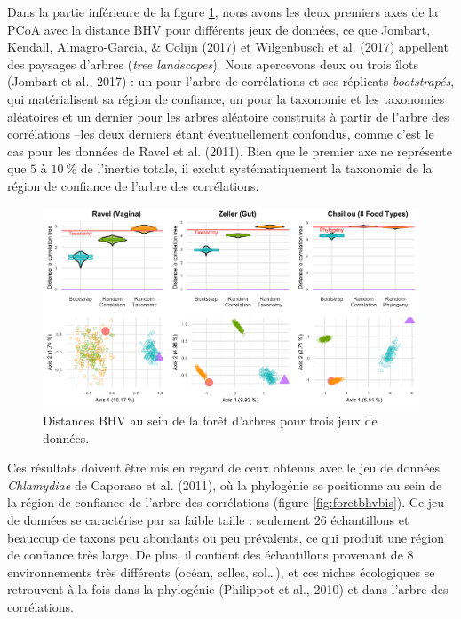 \documentclass[12pt,a4paper]{reedthesis}
\theoremstyle{definition}
\theoremstyle{definition}
\theoremstyle{definition}
\theoremstyle{remark}
\begin{document}
Dans la partie inférieure de la figure \ref{fig:foretbhv}, nous avons les deux premiers axes de la PCoA avec la distance BHV pour différents jeux de données, ce que Jombart, Kendall, Almagro-Garcia, \& Colijn (2017) et Wilgenbusch et al. (2017) appellent des paysages d'arbres (\emph{tree landscapes}). Nous apercevons deux ou trois îlots (Jombart et al., 2017) : un pour l'arbre de corrélations et ses réplicats \emph{bootstrapés}, qui matérialisent sa région de confiance, un pour la taxonomie et les taxonomies aléatoires et un dernier pour les arbres aléatoire construits à partir de l'arbre des corrélations --les deux derniers étant éventuellement confondus, comme c'est le cas pour les données de Ravel et al. (2011). Bien que le premier axe ne représente que \(5\) à \(10~\%\) de l'inertie totale, il exclut systématiquement la taxonomie de la région de confiance de l'arbre des corrélations.


\begin{figure}[t]

{\centering \includegraphics[width=0.9\linewidth]{img/foretbhv} 

}

\caption{Distances BHV au sein de la forêt d'arbres pour trois jeux de données.}\label{fig:foretbhv}
\end{figure}
Ces résultats doivent être mis en regard de ceux obtenus avec le jeu de données \emph{Chlamydiae} de Caporaso et al. (2011), où la phylogénie se positionne au sein de la région de confiance de l'arbre des corrélations (figure \ref{fig:foretbhvbis}). Ce jeu de données se caractérise par sa faible taille : seulement \(26\) échantillons et beaucoup de taxons peu abondants ou peu prévalents, ce qui produit une région de confiance très large. De plus, il contient des échantillons provenant de \(8\) environnements très différents (océan, selles, sol\ldots), et ces niches écologiques se retrouvent à la fois dans la phylogénie (Philippot et al., 2010) et dans l'arbre des corrélations.
\end{document}
